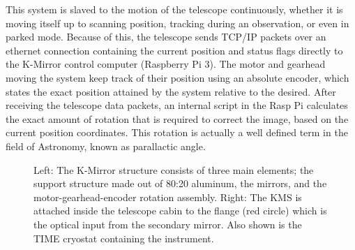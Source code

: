 \documentclass[manuscript]{aastex}
\begin{document}
This system is slaved to the motion of the telescope continuously, whether it is moving itself up to scanning position, tracking during an observation, or even in parked mode. Because of this, the telescope sends TCP/IP packets over an ethernet connection containing the current position and status flags directly to the K-Mirror control computer ({\sc Raspberry Pi 3}). The motor and gearhead moving the system keep track of their position using an absolute encoder, which states the exact position attained by the system relative to the desired. After receiving the telescope data packets, an internal script in the Rasp Pi calculates the exact amount of rotation that is required to correct the image, based on the current position coordinates. This rotation is actually a well defined term in the field of Astronomy, known as parallactic angle. 

\begin{figure}[H]
	\centering
	\qquad
	\singlespace
	\caption[CAD Model of the K-Mirror Structure.]{Left: The K-Mirror structure consists of three main elements; the support structure made out of 80:20 aluminum, the mirrors, and the motor-gearhead-encoder rotation assembly. Right: The KMS is attached inside the telescope cabin to the flange (red circle) which is the optical input from the secondary mirror. Also shown is the TIME cryostat containing the instrument.}%
	\label{fig:km23}%
\end{figure}
\end{document}
